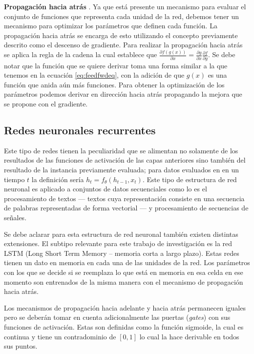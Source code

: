 \textbf{Propagación hacia atrás} \parencite{rumelhart1986learning}. Ya que está presente un mecanismo para evaluar el conjunto de funciones que representa cada unidad de la red, debemos tener un mecanismo para optimizar los parámetros que definen cada función. La propagación hacia atrás se encarga de esto utilizando el concepto previamente descrito como el descenso de gradiente. Para realizar la propagación hacia atrás se aplica la regla de la cadena la cual establece que $\frac{\partial f(g(x))}{\partial x} = \frac{\partial g}{\partial x} \frac{\partial f}{\partial g}$. Se debe notar que la función que se quiere derivar toma una forma similar a la que tenemos en la ecuación \ref{eq:feedfwdeq}, con la adición de que $g(x)$ es una función que anida aún más funciones. Para obtener la optimización de los parámetros podemos derivar en dirección hacia atrás propagando la mejora que se propone con el gradiente.

\subsection{Redes neuronales recurrentes}



Este tipo de redes tienen la peculiaridad que se alimentan no solamente de los resultados de las funciones de activación de las capas anteriores sino también del resultado de la instancia previamente evaluada; para datos evaluados en en un tiempo $t$ la definición sería $h_t = f_{\theta}(h_{t-1}, x_t)$. Este tipo de estructura de red neuronal es aplicado a conjuntos de datos secuenciales como lo es el procesamiento de textos --- textos cuya representación consiste en una secuencia de palabras representadas de forma vectorial --- y procesamiento de secuencias de señales.

Se debe aclarar para esta estructura de red neuronal también existen distintas extensiones. El subtipo relevante para este trabajo de investigación es la red LSTM (Long Short Term Memory -- memoria corta a largo plazo). Estas redes tienen un dato en memoria en cada una de las unidades de la red. Los parámetros con los que se decide si se reemplaza lo que está en memoria en esa celda en ese momento son entrenados de la misma manera con el mecanismo de propagación hacia atrás.

Los mecanismos de propagación hacia adelante y hacia atrás permanecen iguales pero se deberán tomar en cuenta adicionalmente las puertas (\textit{gates}) con sus funciones de activación. Estas son definidas como la función sigmoide, la cual es continua y tiene un contradominio de $[0,1]$ lo cual la hace derivable en todos sus puntos.

